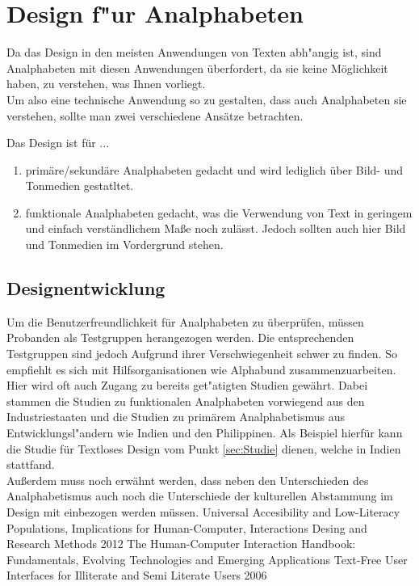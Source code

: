 \section{Design f"ur Analphabeten}

Da das Design in den meisten Anwendungen von Texten abh"angig ist, sind Analphabeten mit diesen Anwendungen überfordert, da sie keine Möglichkeit haben, zu verstehen, was Ihnen vorliegt. \\
Um also eine technische Anwendung so zu gestalten, dass auch Analphabeten sie verstehen, sollte man zwei verschiedene Ansätze betrachten.

Das Design ist für ...
\begin{enumerate}
	\item primäre/sekundäre Analphabeten gedacht und wird lediglich über Bild- und Tonmedien gestatltet.
	\item funktionale Analphabeten gedacht, was die Verwendung von Text in geringem und einfach verständlichem Maße noch zulässt. Jedoch sollten auch hier Bild und Tonmedien im Vordergrund stehen.
\end{enumerate}

\subsection{Designentwicklung}\label{sec:designEval}
Um die Benutzerfreundlichkeit für Analphabeten zu überprüfen, müssen Probanden als Testgruppen herangezogen werden. Die entsprechenden Testgruppen sind jedoch Aufgrund ihrer Verschwiegenheit schwer zu finden. So empfiehlt es sich mit  Hilfsorganisationen wie \glqq Alphabund \grqq zusammenzuarbeiten. Hier wird oft auch Zugang zu bereits get"atigten Studien gewährt. Dabei stammen die Studien zu funktionalen Analphabeten vorwiegend aus den Industriestaaten und die Studien zu primärem Analphabetismus aus Entwicklungsl"andern wie Indien und den Philippinen. Als Beispiel hierfür kann die Studie für Textloses Design vom Punkt \ref{sec:Studie} dienen, welche in Indien stattfand. \\
Außerdem muss noch erwähnt werden, dass neben den Unterschieden des Analphabetismus auch noch die Unterschiede der kulturellen Abstammung im Design mit einbezogen werden müssen.
					{Universal Accesibility and Low-Literacy Populations, Implications for Human-Computer, Interactions Desing and Research Methods}
					{2012}
					{The Human-Computer Interaction Handbook: Fundamentals, Evolving Technologies and Emerging Applications}
					{Text-Free User Interfaces for Illiterate and Semi Literate Users}
					{2006}{}

